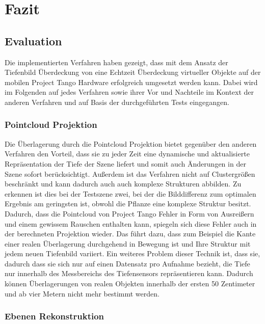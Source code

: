 \chapter{Fazit} \label{sec:conclusion}

\section{Evaluation}

Die implementierten Verfahren haben gezeigt, dass mit dem Ansatz der Tiefenbild Überdeckung von \citet{wloka1995resolving} eine Echtzeit Überdeckung virtueller Objekte auf der mobilen Project Tango Hardware erfolgreich umgesetzt werden kann. Dabei wird im Folgenden auf jedes Verfahren sowie ihrer Vor und Nachteile im Kontext der anderen Verfahren und auf Basis der durchgeführten Tests eingegangen. \\

\subsection*{Pointcloud Projektion}

Die Überlagerung durch die Pointcloud Projektion bietet gegenüber den anderen Verfahren den Vorteil, dass sie zu jeder Zeit eine dynamische und aktualisierte Repräsentation der Tiefe der Szene liefert und somit auch Änderungen in der Szene sofort berücksichtigt. Außerdem ist das Verfahren nicht auf Clustergrößen beschränkt und kann dadurch auch auch komplexe Strukturen abbilden. Zu erkennen ist dies bei der Testszene zwei, bei der die Bilddifferenz zum optimalen Ergebnis am geringsten ist, obwohl die Pflanze eine komplexe Struktur besitzt.\\

Dadurch, dass die Pointcloud von Project Tango Fehler in Form von Ausreißern und einem gewissem Rauschen enthalten kann, spiegeln sich diese Fehler auch in der berechneten Projektion wieder. Das führt dazu, dass zum Beispiel die Kante einer realen Überlagerung durchgehend in Bewegung ist und Ihre Struktur mit jedem neuen Tiefenbild variiert. Ein weiteres Problem dieser Technik ist, dass sie, dadurch dass sie sich nur auf einen Datensatz pro Aufnahme bezieht, die Tiefe nur innerhalb des Messbereichs des Tiefensensors repräsentieren kann. Dadurch können Überlagerungen von realen Objekten innerhalb der ersten 50 Zentimeter und ab vier Metern nicht mehr bestimmt werden.\\

\subsection*{Ebenen Rekonstruktion}

